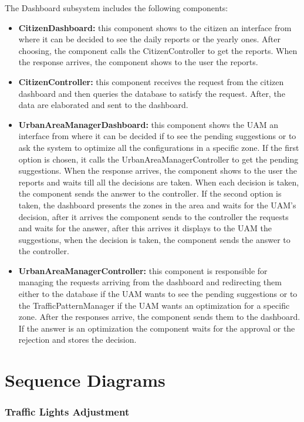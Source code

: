 \documentclass[12pt, a4paper, twoside, openright]{report}
\begin{document}
The Dashboard subsystem includes the following components:

\begin{itemize}
\item
  \textbf{CitizenDashboard:} this component shows to the citizen an
  interface from where it can be decided to see the daily reports or the
  yearly ones. After choosing, the component calls the CitizenController
  to get the reports. When the response arrives, the component shows to
  the user the reports.
\item
  \textbf{CitizenController:} this component receives the request from
  the citizen dashboard and then queries the database to satisfy the
  request. After, the data are elaborated and sent to the dashboard.
\item
  \textbf{UrbanAreaManagerDashboard:} this component shows the UAM an
  interface from where it can be decided if to see the pending
  suggestions or to ask the system to optimize all the configurations in
  a specific zone. If the first option is chosen, it calls the
  UrbanAreaManagerController to get the pending suggestions. When the
  response arrives, the component shows to the user the reports and
  waits till all the decisions are taken. When each decision is taken,
  the component sends the answer to the controller. If the second option
  is taken, the dashboard presents the zones in the area and waits for
  the UAM's decision, after it arrives the component sends to the
  controller the requests and waits for the answer, after this arrives
  it displays to the UAM the suggestions, when the decision is taken,
  the component sends the answer to the controller.
\item
  \textbf{UrbanAreaManagerController:} this component is responsible for
  managing the requests arriving from the dashboard and redirecting them
  either to the database if the UAM wants to see the pending suggestions
  or to the TrafficPatternManager if the UAM wants an optimization for a
  specific zone. After the responses arrive, the component sends them to
  the dashboard. If the answer is an optimization the component waits
  for the approval or the rejection and stores the decision.
\end{itemize}
  
\section{Sequence Diagrams}
\subsubsection{Traffic Lights Adjustment}
\end{document}
